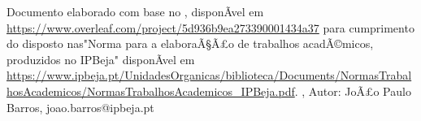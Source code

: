 \documentclass[PT,alphabetic]{ipbeja-format}
\begin{document}
\setcounter{page}{1}
\thispagestyle{empty} 
 
\pagestyle{ruled} 





%

\indicegeral  
\indicedefiguras %
\indicedetabelas %
\indicedelistagens %
% 
% 










\clearpage
\thispagestyle{empty}

\sloppy
\printbibliography[heading=subbibliography]
\thispagestyle{empty}

\apendices

\anexos



\vfill

\SingleSpacing
{\tiny Documento elaborado com base no , disponÃ­vel em \url{https://www.overleaf.com/project/5d936b9ea273390001434a37} para cumprimento do disposto nas"Norma para a elaboraÃ§Ã£o de trabalhos acadÃ©micos, produzidos no IPBeja" disponÃ­vel em \url{https://www.ipbeja.pt/UnidadesOrganicas/biblioteca/Documents/NormasTrabalhosAcademicos/NormasTrabalhosAcademicos_IPBeja.pdf}.
    \version, Autor: JoÃ£o Paulo Barros, joao.barros@ipbeja.pt}
\end{document}
